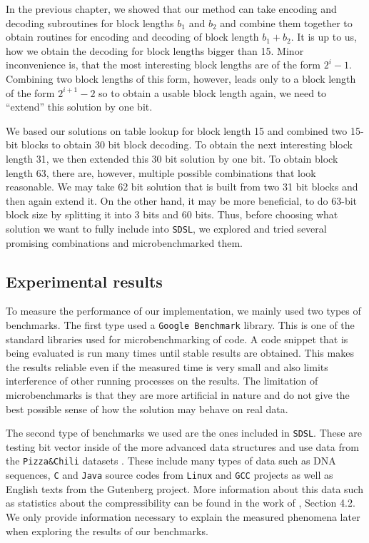 In the previous chapter, we showed that our method can take encoding and decoding subroutines
for block lengths $b_1$ and $b_2$ and combine them together to obtain routines for encoding and
decoding of block length $b_1+b_2$. It is up to us, how we obtain the decoding for block
lengths bigger than 15. Minor inconvenience is, that the most interesting block lengths are of
the form $2^i-1$. Combining two block lengths of this form, however, leads only to a block length
of the form $2^{i+1}-2$ so to obtain a usable block length again, we need to ``extend'' this solution
by one bit.

We based our solutions on table lookup for block length 15 and combined two 15-bit blocks to obtain
30 bit block decoding. To obtain the next interesting block length 31, we then extended this 30 bit
solution by one bit. To obtain block length 63, there are, however, multiple possible combinations
that look reasonable. We may take 62 bit solution that is built from two 31 bit blocks
and then again extend it. On the other hand, it may be more beneficial, to do 63-bit block size by
splitting it into 3 bits and 60 bits. Thus, before choosing what solution we want to fully include
into \texttt{SDSL}, we explored and tried several promising combinations and microbenchmarked them.

\subsection{Experimental results}

To measure the performance of our implementation, we mainly used two types of benchmarks. The first
type used a \texttt{Google Benchmark} library. This is one of the standard libraries used for
microbenchmarking of code. A code snippet that is being evaluated is run many times until
stable results are obtained. This makes the results reliable even if the measured time is
very small and also limits interference of other running processes on the results. The
limitation of microbenchmarks is that they are more artificial in nature and
do not give the best possible sense of how the solution may behave on real data.

The second type of benchmarks we used are the ones included in \texttt{SDSL}. These are
testing bit vector inside of the more advanced data structures and use data from the
\texttt{Pizza\&Chili} datasets \citep{ferragina2005pizza}. These include many types of data
such as DNA sequences, \texttt{C} and \texttt{Java} source codes from \texttt{Linux} and
\texttt{GCC} projects as well as English texts from the Gutenberg project. More information
about this data such as statistics about the compressibility can be found in the work of
\cite{ferragina2009compressed}, Section 4.2. We only provide information necessary to explain the
measured phenomena later when exploring the results of our benchmarks.

